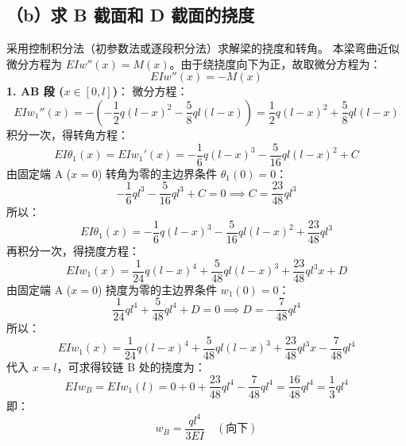 \documentclass[UTF8,fontset=windows]{ctexart}
\begin{document}
\subsection*{（b）求 B 截面和 D 截面的挠度}

采用控制积分法（初参数法或逐段积分法）求解梁的挠度和转角。
本梁弯曲近似微分方程为 $EI w''(x) = M(x)$。由于绕挠度向下为正，故取微分方程为：
\[
    EI w''(x) = -M(x)
\]
\textbf{1. AB 段 ($x \in [0, l]$)}：
微分方程：
\[
    EI w_1''(x) = - \left( -\frac{1}{2} q(l-x)^2 - \frac{5}{8} ql(l-x) \right) = \frac{1}{2} q(l-x)^2 + \frac{5}{8} ql(l-x)
\]
积分一次，得转角方程：
\[
    EI \theta_1(x) = EI w_1'(x) = -\frac{1}{6} q(l-x)^3 - \frac{5}{16} ql(l-x)^2 + C
\]
由固定端 A ($x=0$) 转角为零的主边界条件 $\theta_1(0) = 0$：
\[
    -\frac{1}{6} ql^3 - \frac{5}{16} ql^3 + C = 0 \implies C = \frac{23}{48} ql^3
\]
所以：
\[
    EI \theta_1(x) = -\frac{1}{6} q(l-x)^3 - \frac{5}{16} ql(l-x)^2 + \frac{23}{48} ql^3
\]
再积分一次，得挠度方程：
\[
    EI w_1(x) = \frac{1}{24} q(l-x)^4 + \frac{5}{48} ql(l-x)^3 + \frac{23}{48} ql^3 x + D
\]
由固定端 A ($x=0$) 挠度为零的主边界条件 $w_1(0) = 0$：
\[
    \frac{1}{24} ql^4 + \frac{5}{48} ql^4 + D = 0 \implies D = -\frac{7}{48} ql^4
\]
所以：
\[
    EI w_1(x) = \frac{1}{24} q(l-x)^4 + \frac{5}{48} ql(l-x)^3 + \frac{23}{48} ql^3 x - \frac{7}{48} ql^4
\]
代入 $x=l$，可求得铰链 B 处的挠度为：
\[
    EI w_B = EI w_1(l) = 0 + 0 + \frac{23}{48} ql^4 - \frac{7}{48} ql^4 = \frac{16}{48} ql^4 = \frac{1}{3} ql^4
\]
即：
\[
    w_B = \frac{ql^4}{3EI} \quad (\text{向下})
\]
\end{document}
